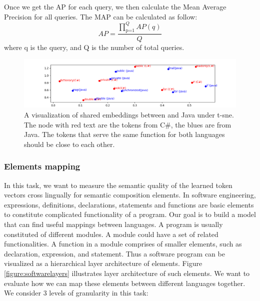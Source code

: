 Once we get the AP for each query, we then calculate the Mean Average Precision for all queries. The MAP can be calculated as follow:
\begin{displaymath}
AP = \frac{\prod_\text{p=1}^Q AP(q)}{Q}
\end{displaymath}
where q is the query, and Q is the number of total queries.
\begin{figure}[t!]
	\centering
	\includegraphics[width=1\textwidth]{example_bi2vec_tsne}
	\caption{A visualization of shared embeddings between  and Java under t-sne. The node with red text are the tokens from C\#, the blues are from Java. The tokens that serve the same function for both languages should be close to each other.}
	\label{fig:tsne}
\end{figure}
\subsubsection{Elements mapping}
In this task, we want to measure the semantic quality of the learned token vectors cross lingually for semantic composition elements. In software engineering, expressions, definitions, declarations, statements and functions are basic elements to constitute complicated functionality of a program. Our goal is to build a model that can find useful mappings between languages. A program is usually constituted of different modules. A module could have a set of related functionalities. A function in a module comprises of smaller elements, such as declaration, expression, and statement. Thus a software program can be visualized as a hierarchical layer architecture of elements. Figure \ref{figure:softwarelayers} illustrates layer architecture of such elements. We want to evaluate how we can map these elements between different languages together. We consider 3 levels of granularity in this task:

